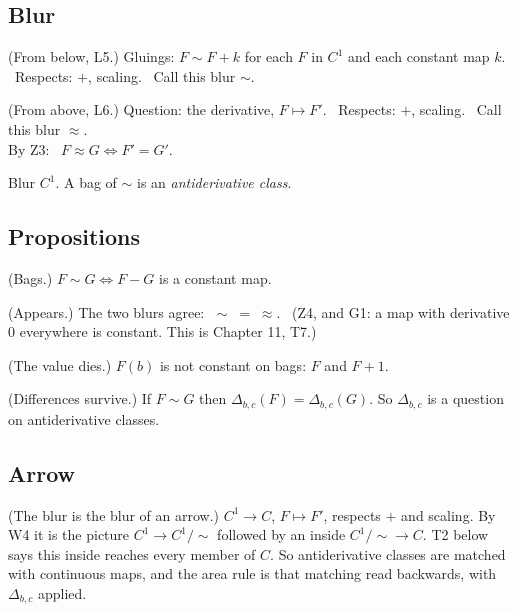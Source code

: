 \subsection*{Blur}

\begin{lines}
\item[\lab{B1}] (From below, L5.) Gluings: $F \sim F + k$ for each $F$ in $C^1$ and each constant map $k$. \ Respects: $+$, scaling. \ Call this blur $\sim$.
\item[\lab{B2}] (From above, L6.) Question: the derivative, $F \mapsto F'$. \ Respects: $+$, scaling. \ Call this blur $\approx$. \\
By Z3: \ $F \approx G \iff F' = G'$.
\item[] Blur $C^1$. A bag of $\sim$ is an \emph{antiderivative class}.
\end{lines}

\subsection*{Propositions}

\begin{lines}
\item[\lab{P1}] (Bags.) $F \sim G \iff F - G$ is a constant map.
\item[\lab{P2}] (Appears.) The two blurs agree: $\;\sim \;=\; \approx$. \ (Z4, and G1: a map with derivative $0$ everywhere is constant. This is Chapter 11, T7.)
\item[\lab{P3}] (The value dies.) $F(b)$ is not constant on bags: $F$ and $F + 1$.
\item[\lab{P4}] (Differences survive.) If $F \sim G$ then $\Delta_{b,c}(F) = \Delta_{b,c}(G)$. So $\Delta_{b,c}$ is a question on antiderivative classes.
\end{lines}

\subsection*{Arrow}

\begin{lines}
\item[\lab{P5}] (The blur is the blur of an arrow.) $C^1 \to C$, $F \mapsto F'$, respects $+$ and scaling. By W4 it is the picture $C^1 \to C^1/{\sim}$ followed by an inside $C^1/{\sim} \to C$. T2 below says this inside reaches every member of $C$. So antiderivative classes are matched with continuous maps, and the area rule is that matching read backwards, with $\Delta_{b,c}$ applied.
\end{lines}

